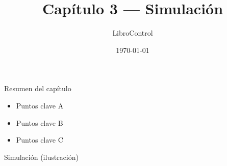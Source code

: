 \documentclass{beamer}
\title{Capítulo 3 — Simulación}
\author{LibroControl}
\date{\today}
\begin{document}
\begin{frame}
  \titlepage
\end{frame}

\begin{frame}{Resumen del capítulo}
  \begin{itemize}
    \item Puntos clave A
    \item Puntos clave B
    \item Puntos clave C
  \end{itemize}
\end{frame}

\begin{frame}{Simulación (ilustración)}
  \centering
\end{frame}
\end{document}
